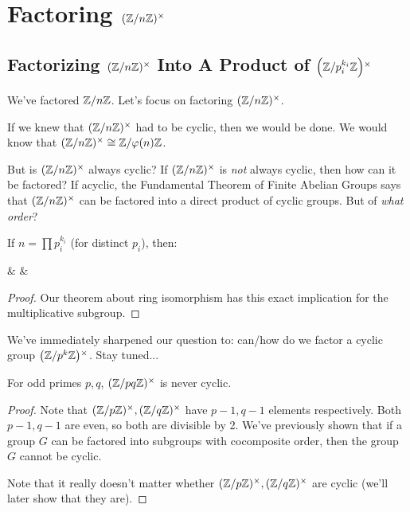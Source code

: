 \section{Factoring $\Zmodnx$}

\subsection{Factorizing $\Zmodnx$ Into A Product of $\Zmodx{p_i^{k_i}}$}

\begin{remark}
  We've factored $\Zmodn$. Let's focus on factoring $\Zmodnx$.

  If we knew that $\Zmodnx$ had to be cyclic, then we would be done. We
  would know that $\Zmodnx \cong \Zmod{\vphif{n}}$.

  But is $\Zmodnx$ always cyclic? If $\Zmodnx$ is \emph{not} always
  cyclic, then how can it be factored? If acyclic, the Fundamental
  Theorem of Finite Abelian Groups says that $\Zmodnx$ can be factored
  into a direct product of cyclic groups. But of \emph{what order}?
\end{remark}

\begin{theorem}
  If $n = \prod p_i^{k_i}$ (for distinct $p_i$), then:

  \begin{nedqn}
  & \cong &
     \times \cdots \times {}
  \end{nedqn}
\end{theorem}

\begin{proof}
  Our theorem about ring isomorphism has this exact implication for the
  multiplicative subgroup.
\end{proof}

\begin{remark}
  We've immediately sharpened our question to: can/how do we factor a
  cyclic group $\Zmodx{p^k}$. Stay tuned...
\end{remark}

\begin{proposition}
  For odd primes $p, q$, $\Zmodx{pq}$ is never cyclic.
\end{proposition}

\begin{proof}
  Note that $\Zmodx{p}, \Zmodx{q}$ have $p-1, q-1$ elements
  respectively. Both $p-1, q-1$ are even, so both are divisible by 2.
  We've previously shown that if a group $G$ can be factored into
  subgroups with cocomposite order, then the group $G$ cannot be cyclic.

  Note that it really doesn't matter whether $\Zmodx{p}, \Zmodx{q}$ are
  cyclic (we'll later show that they are).
\end{proof}

